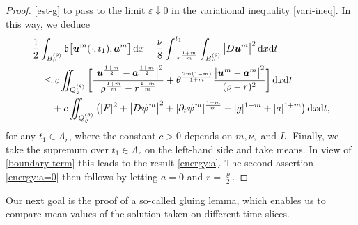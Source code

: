 \documentclass[a4paper, 10pt, american]{amsart}
\numberwithin{theorem}{section}
\numberwithin{equation}{section}
\newcommand{\dxdt}{\,\mathrm{d}x\mathrm{d}t}
\newcommand{\dx}{\,\mathrm{d}x}
\renewcommand{\epsilon}{\varepsilon}
\renewcommand{\epsilon}{\varepsilon}
\renewcommand{\rho}{\varrho}
\newcommand{\power}[2]{\bm{#1^{\mbox{\unboldmath{\scriptsize$#2$}}}}}
\begin{document}
\begin{proof}
\eqref{est-g} to pass to the limit $\epsilon\downarrow 0$ in the
variational inequality \eqref{vari-ineq}. In this way, we deduce 
\begin{align*}
	&\frac12\int_{B_r^{(\theta)}} \mathfrak b\big[ \power um(\cdot, t_1), \power am\big] \dx +  
	\frac{\nu}{8}
	\int_{- r^{\frac{1+m}{m}}}^{t_1}\int_{B_r^{(\theta)}}  
	\big|D\power u{m}\big|^2 \dxdt \\
	&\quad\leq 
	c \iint_{Q_\rho^{(\theta)}}
	\bigg[
	\frac{\big| \power u {\frac{1+m}2}-\power a {\frac{1+m}2}\big|^2}{\rho^{\frac{1+m}{m}}-r^{\frac{1+m}{m}}}
	+ 
	\theta^{\frac{2m(1-m)}{1+m}} \frac{\big|\power u{m}-\power a{m}\big|^2}{(\rho-r)^2} 
	\bigg]  
	\dxdt \\
	&\quad\quad + c \iint_{Q_{\rho}^{(\theta)}}\big( |F|^{2}
        +\big|D\power \psi m \big|^2 + |\partial_t \power \psi m|^{\frac{1+m}{m}} + |g|^{1+m}+ |a|^{1+m}\big) \dxdt,
\end{align*}
for any $t_1 \in \Lambda_r$, where the constant $c>0$ depends on $m,
\nu,$ and $L$.
Finally, we take the supremum over $t_1 \in \Lambda_r$ on the
left-hand side and take means. In view of \eqref{boundary-term} this
leads to the result \eqref{energy:a}. The second assertion
\eqref{energy:a=0} then follows by letting $a=0$ and $r=\frac\rho2$.
\end{proof}

Our next goal is the proof of a so-called gluing lemma, which enables
us to compare mean values of the solution taken on different time slices.  
\end{document}
